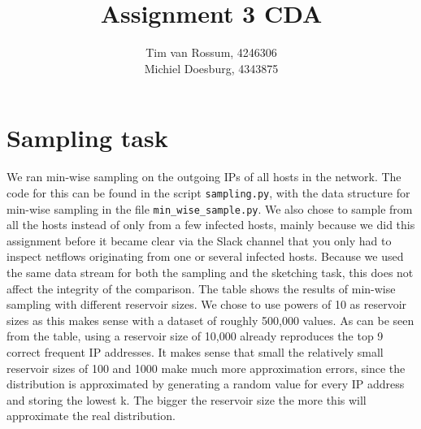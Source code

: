 \documentclass[]{article}
\title{Assignment 3 CDA}
\author{Tim van Rossum, 4246306\\
	Michiel Doesburg, 4343875}
\begin{document}
\maketitle

\section{Sampling task}
We ran min-wise sampling on the outgoing IPs of all hosts in the network. The code for this can be found in the script \texttt{sampling.py}, with the data structure for min-wise sampling in the file \texttt{min\_wise\_sample.py}. We also chose to sample from all the hosts instead of only from a few infected hosts, mainly because we did this assignment before it became clear via the Slack channel that you only had to inspect netflows originating from one or several infected hosts. Because we used the same data stream for both the sampling and the sketching task, this does not affect the integrity of the comparison. The table shows the results of min-wise sampling with different reservoir sizes. We chose to use powers of 10 as reservoir sizes as this makes sense with a dataset of roughly 500,000 values. As can be seen from the table, using a reservoir size of 10,000 already reproduces the top 9 correct frequent IP addresses. It makes sense that small the relatively small reservoir sizes of 100 and 1000 make much more approximation errors, since the distribution is approximated by generating a random value for every IP address and storing the lowest k. The bigger the reservoir size the more this will approximate the real distribution. 
\end{document}

